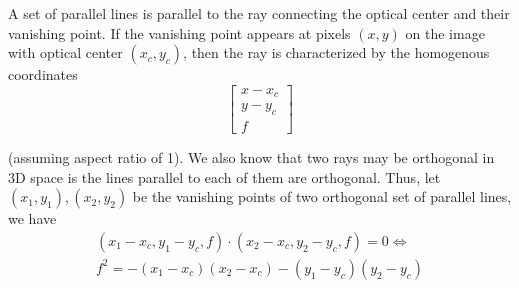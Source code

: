 \documentclass{article}
\begin{document}
A set of parallel lines is parallel to the ray connecting the optical center and their vanishing point. 
If the vanishing point appears at pixels $(x, y)$ on the image with optical center $(x_c, y_c)$, then 
the ray is characterized by the homogenous coordinates
$$ 
\begin{bmatrix}
    x - x_c \\
    y - y_c \\ 
    f
\end{bmatrix}
$$

(assuming aspect ratio of 1). 
We also know that two rays may be orthogonal in 3D space is the lines parallel to each of them are orthogonal. 
Thus, let $(x_1, y_1), (x_2, y_2)$ be the vanishing points of two orthogonal set of parallel lines, 
we have 
\begin{align*}
    (x_1 - x_c, y_1 - y_c, f) \cdot (x_2 - x_c, y_2 - y_c, f) = 0 \Leftrightarrow\\
    f^2 = -(x_1 - x_c)(x_2 - x_c) - (y_1 - y_c)(y_2 - y_c)
\end{align*}
\end{document}
